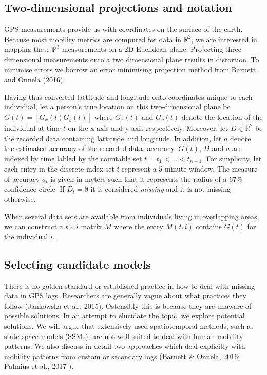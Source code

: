 \documentclass[english,man]{apa6}
\theoremstyle{definition}
\theoremstyle{definition}
\theoremstyle{definition}
\theoremstyle{remark}
\begin{document}
\subsection{Two-dimensional projections and
notation}\label{two-dimensional-projections-and-notation}

GPS measurements provide us with coordinates on the surface of the
earth. Because most mobility metrics are computed for data in
\(\mathbb{R}^2\), we are interested in mapping these \(\mathbb{R}^3\)
measurements on a 2D Euclidean plane. Projecting three dimensional
measurements onto a two dimensional plane results in distortion. To
minimise errors we borrow an error minimising projection method from
Barnett and Onnela (2016).

Having thus converted lattitude and longitude onto coordinates unique to
each individual, let a person's true location on this two-dimensional
plane be \(G(t) = [G_x(t) G_y(t)]\) where \(G_x(t)\) and \(G_y(t)\)
denote the location of the individual at time \(t\) on the x-axis and
y-axis respectively. Moreover, let \(D \in \mathbb{R}^2\) be the
recorded data containing lattitude and longitude. In addition, let \(a\)
denote the estimated accuracy of the recorded data. accuracy. \(G(t)\),
\(D\) and \(a\) are indexed by time labled by the countable set
\(t = t_1 < ... < t_{n+1}\). For simplicity, let each entry in the
discrete index set \(t\) represent a 5 minute window. The measure of
accuracy \(a_t\) is given in meters such that it represents the radius
of a 67\% confidence circle. If \(D_t = \emptyset\) it is considered
\emph{missing} and it is not missing otherwise.

When several data sets are available from individuals living in
overlapping areas we can construct a \(t \times i\) matrix \(M\) where
the entry \(M(t,i)\) contains \(G(t)\) for the individual \(i\).

\subsection{Selecting candidate
models}\label{selecting-candidate-models}

There is no golden standard or established practice in how to deal with
missing data in GPS logs. Researchers are generally vague about what
practices they follow (Jankowska et al., 2015). Ostensibly this is
because they are unaware of possible solutions. In an attempt to
elucidate the topic, we explore potential solutions. We will argue that
extensively used spatiotemporal methods, such as state space models
(SSMs), are not well suited to deal with human mobility patterns. We
also discuss in detail two approaches which deal explicitly with
mobility patterns from custom or secondary logs (Barnett \& Onnela,
2016; Palmius et al., 2017 ).
\end{document}
